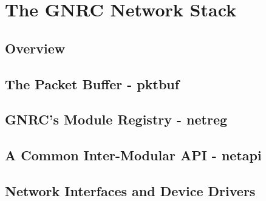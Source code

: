 \chapter{The GNRC Network Stack}
\section{Overview}
\section{The Packet Buffer - pktbuf}
\section{GNRC's Module Registry - netreg}
\section{A Common Inter-Modular API - netapi}
\section{Network Interfaces and Device Drivers}


